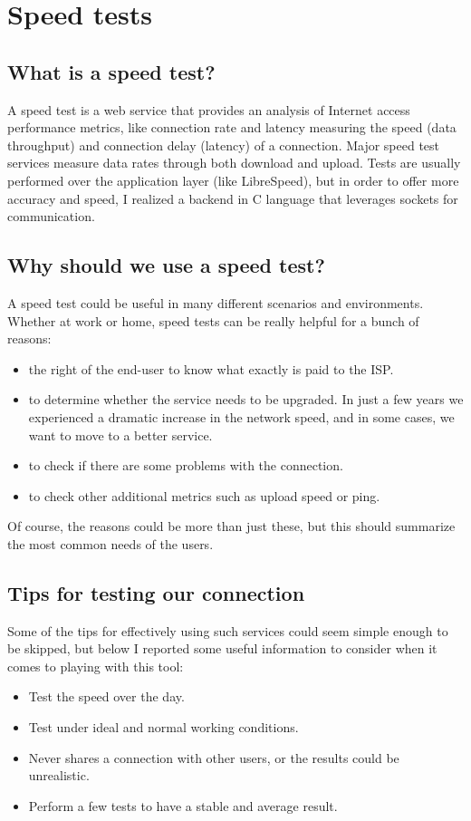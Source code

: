 \documentclass{article}
\begin{document}
\newpage
\section{Speed tests}
\subsection{What is a speed test?}
A speed test is a web service that provides an analysis of Internet access performance metrics, like connection rate and latency measuring the speed (data throughput) and connection delay (latency) of a connection. Major speed test services measure data rates through both download and upload. Tests are usually performed over the application layer (like LibreSpeed), but in order to offer more accuracy and speed, I realized a backend in C language that leverages sockets for communication.

\subsection{Why should we use a speed test?}
A speed test could be useful in many different scenarios and environments. Whether at work or home, speed tests can be really helpful for a bunch of reasons:
\begin{itemize}
\item the right of the end-user to know what exactly is paid to the ISP.
\item to determine whether the service needs to be upgraded. In just a few years we experienced a dramatic increase in the network speed, and in some cases, we want to move to a better service.
\item to check if there are some problems with the connection.
\item to check other additional metrics such as upload speed or ping.
\end{itemize}
Of course, the reasons could be more than just these, but this should summarize the most common needs of the users.

\subsection{Tips for testing our connection}
Some of the tips for effectively using such services could seem simple enough to be skipped, but below I reported some useful information to consider when it comes to playing with this tool:
\begin{itemize}
\item Test the speed over the day.
\item Test under ideal and normal working conditions.
\item Never shares a connection with other users, or the results could be unrealistic.
\item Perform a few tests to have a stable and average result.
\end{itemize}
\end{document}
